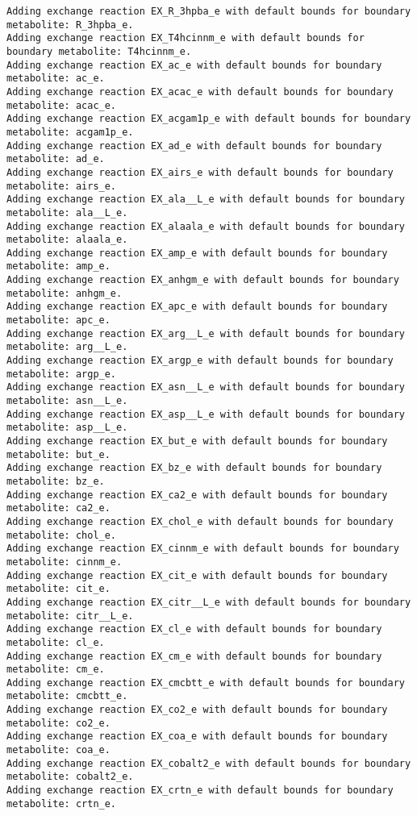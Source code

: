 \documentclass[
  letterpaper,
  DIV=11,
  numbers=noendperiod]{scrartcl}
\begin{document}
\begin{verbatim}
Adding exchange reaction EX_R_3hpba_e with default bounds for boundary metabolite: R_3hpba_e.
Adding exchange reaction EX_T4hcinnm_e with default bounds for boundary metabolite: T4hcinnm_e.
Adding exchange reaction EX_ac_e with default bounds for boundary metabolite: ac_e.
Adding exchange reaction EX_acac_e with default bounds for boundary metabolite: acac_e.
Adding exchange reaction EX_acgam1p_e with default bounds for boundary metabolite: acgam1p_e.
Adding exchange reaction EX_ad_e with default bounds for boundary metabolite: ad_e.
Adding exchange reaction EX_airs_e with default bounds for boundary metabolite: airs_e.
Adding exchange reaction EX_ala__L_e with default bounds for boundary metabolite: ala__L_e.
Adding exchange reaction EX_alaala_e with default bounds for boundary metabolite: alaala_e.
Adding exchange reaction EX_amp_e with default bounds for boundary metabolite: amp_e.
Adding exchange reaction EX_anhgm_e with default bounds for boundary metabolite: anhgm_e.
Adding exchange reaction EX_apc_e with default bounds for boundary metabolite: apc_e.
Adding exchange reaction EX_arg__L_e with default bounds for boundary metabolite: arg__L_e.
Adding exchange reaction EX_argp_e with default bounds for boundary metabolite: argp_e.
Adding exchange reaction EX_asn__L_e with default bounds for boundary metabolite: asn__L_e.
Adding exchange reaction EX_asp__L_e with default bounds for boundary metabolite: asp__L_e.
Adding exchange reaction EX_but_e with default bounds for boundary metabolite: but_e.
Adding exchange reaction EX_bz_e with default bounds for boundary metabolite: bz_e.
Adding exchange reaction EX_ca2_e with default bounds for boundary metabolite: ca2_e.
Adding exchange reaction EX_chol_e with default bounds for boundary metabolite: chol_e.
Adding exchange reaction EX_cinnm_e with default bounds for boundary metabolite: cinnm_e.
Adding exchange reaction EX_cit_e with default bounds for boundary metabolite: cit_e.
Adding exchange reaction EX_citr__L_e with default bounds for boundary metabolite: citr__L_e.
Adding exchange reaction EX_cl_e with default bounds for boundary metabolite: cl_e.
Adding exchange reaction EX_cm_e with default bounds for boundary metabolite: cm_e.
Adding exchange reaction EX_cmcbtt_e with default bounds for boundary metabolite: cmcbtt_e.
Adding exchange reaction EX_co2_e with default bounds for boundary metabolite: co2_e.
Adding exchange reaction EX_coa_e with default bounds for boundary metabolite: coa_e.
Adding exchange reaction EX_cobalt2_e with default bounds for boundary metabolite: cobalt2_e.
Adding exchange reaction EX_crtn_e with default bounds for boundary metabolite: crtn_e.

\end{verbatim}
\end{document}
